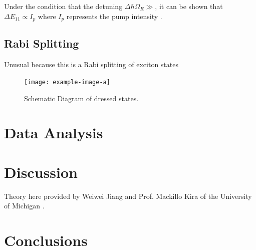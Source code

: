 Under the condition that the detuning $\Delta \hbar \Omega_R\gg $, it can be shown that $\Delta E_{11} \propto I_p$ where $I_p$ represents the pump intensity \cite{cong2018}. 
\subsection{Rabi Splitting}

Unusual because this is a Rabi splitting of exciton states \cite{cong2018}

\begin{figure}[H]
	\centering
	\texttt{[image: example-image-a]}
	\caption{Schematic Diagram of dressed states. }
\end{figure}

\section{Data Analysis}

\section{Discussion}

Theory here provided by Weiwei Jiang and Prof. Mackillo Kira of the University of Michigan \cite{mack2019}.

\section{Conclusions}